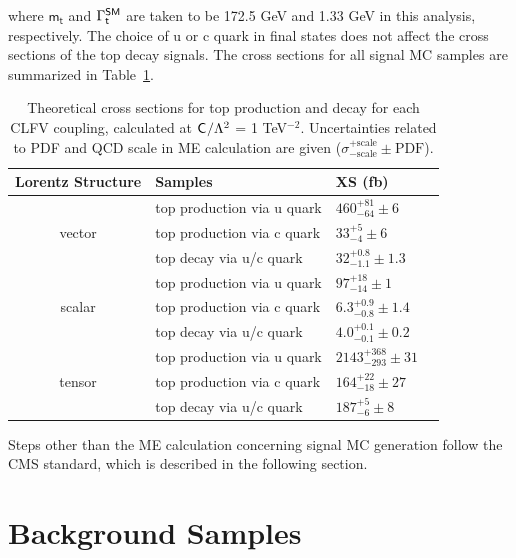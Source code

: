where $\textsf{m}_{\textsf{t}}$ and $\mathrm{\Gamma}_{\textsf{t}}^{\textsf{SM}}$ are taken to be 172.5 GeV and 1.33 GeV in this analysis, respectively. The choice of u or c quark in final states does not affect the cross sections of the top decay signals. The cross sections for all signal \ac{MC} samples are summarized in Table~\ref{tab:signal}.

\begin{table}[th]
\sffamily
\centering
\caption{Theoretical cross sections for top production and decay for each \ac{CLFV} coupling, calculated at $\textsf{C}^{}_{}/\mathrm{\Lambda}^2$ = 1 TeV$^{-2}$. Uncertainties related to PDF and QCD scale in \ac{ME} calculation are given ($\sigma^{+\text{scale}}_{-\text{scale}}\pm \text{PDF}$).}
\begin{tabular}{clll}
\toprule 
Lorentz Structure    & Samples              & XS (fb)   \\  \midrule
\multirow{3}{*}{vector} & top production via u quark  & $460^{+81}_{-64}\pm6$ \\ 
      &  top production via c quark & $33^{+5}_{-4}\pm6$    \\
      & top decay via u/c quark        & $32^{+0.8}_{-1.1}\pm1.3$   \\  \midrule
\multirow{3}{*}{scalar} &top production via u quark  & $97^{+18}_{-14}\pm1$  \\ 
      & top production via c quark       & $6.3^{+0.9}_{-0.8}\pm1.4$  \\
      &  top decay via u/c quark    &  $4.0^{+0.1}_{-0.1}\pm0.2$  \\  \midrule 
\multirow{3}{*}{tensor} &  top production via u quark & $2143^{+368}_{-293}\pm31$  \\
      &  top production via c quark & $164^{+22}_{-18}\pm27$   \\
      &  top decay via u/c quark     & $187^{+5}_{-6}\pm8$   \\  \bottomrule
\end{tabular}
\vspace{-0.5em}
\label{tab:signal}
\end{table}

Steps other than the \ac{ME} calculation concerning signal \ac{MC} generation follow the \ac{CMS} standard, which is described in the following section.
\section{Background Samples}
\label{sec:Backgrounds}

